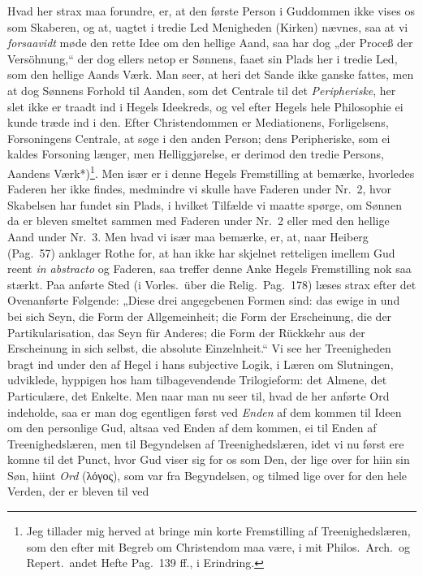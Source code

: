 \documentclass[12pt,a4paper]{book}
\newcommand{\apage}[1]{\marginnote{\footnotesize\textit{[#1]}}}
\begin{document}
Hvad her strax maa forundre, er, at den første Person i Guddommen ikke vises os
som Skaberen, og at, uagtet i tredie Led Menigheden (Kirken) nævnes, saa at vi
\emph{forsaavidt} møde den rette Idee om den hellige Aand, saa har dog „der Proceß der
Versöhnung,“ der dog ellers netop er Sønnens, faaet sin Plads her i tredie Led,
som den hellige Aands Værk. Man seer, at heri det Sande ikke ganske fattes, men
at dog Sønnens Forhold til Aanden, som det Centrale til det \emph{Peripheriske}, her
slet ikke er traadt ind i Hegels Ideekreds, og vel efter Hegels hele Philosophie
ei kunde træde ind i den. Efter Christendommen er Mediationens, Forligelsens,
Forsoningens Centrale, at søge i den anden Person; dens Peripheriske, som ei
kaldes Forsoning længer, men Helliggjørelse, er derimod den tredie Persons,
Aandens Værk*)\footnote{Jeg tillader mig herved at bringe min korte Fremstilling
af Treenighedslæren, som den efter mit Begreb om Christendom maa være, i mit
Philos.\ Arch.\ og Repert.\ andet Hefte Pag.\ 139 ff., i Erindring.}. Men især
er i denne Hegels Fremstilling at bemærke, hvorledes Faderen her ikke findes,
medmindre vi skulle have Faderen under Nr.\ 2, hvor Skabelsen har fundet sin
Plads, i hvilket Tilfælde vi maatte spørge, om Sønnen da er bleven smeltet
sammen med Faderen under Nr.\ 2 eller med den hellige Aand under Nr.\ 3. Men
hvad vi især maa bemærke, er, at, naar Heiberg (Pag.\ 57) anklager Rothe for, at
han ikke har skjelnet retteligen imellem Gud reent \textit{in abstracto} og
Faderen, saa treffer denne Anke Hegels Fremstilling nok saa stærkt. Paa anførte
Sted (i Vorles.\ über die Relig.\ Pag.\ 178) læses strax efter det Ovenanførte
Følgende: „Diese drei angegebenen Formen sind: das ewige in und bei sich Seyn,
die Form der Allgemeinheit; die Form der Erscheinung, die der Partikularisation,
das Seyn für \apage{141} Anderes; die Form der Rückkehr aus der Erscheinung in sich selbst,
die absolute Einzelnheit.“ Vi see her Treenigheden bragt ind under den af Hegel
i hans subjective Logik, i Læren om Slutningen, udviklede, hyppigen hos ham
tilbagevendende Trilogieform: det Almene, det Particulære, det Enkelte. Men naar
man nu seer til, hvad de her anførte Ord indeholde, saa er man dog egentligen
først ved \emph{Enden} af dem kommen til Ideen om den personlige Gud, altsaa ved Enden
af dem kommen, ei til Enden af Treenighedslæren, men til Begyndelsen af
Treenighedslæren, idet vi nu først ere komne til det Punct, hvor Gud viser sig
for os som Den, der lige over for hiin sin Søn, hiint \emph{Ord} (λόγος), som var fra
Begyndelsen, og tilmed lige over for den hele Verden, der er bleven til ved
\end{document}

